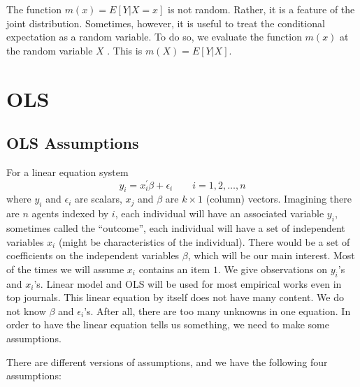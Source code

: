 \documentclass[11pt,a4paper]{amsart}
\theoremstyle{plain}
\theoremstyle{definition}
\begin{document}
	The function $m(x) = E [Y | X = x]$ is not random. Rather, it is a feature of the joint distribution. Sometimes, however, it is useful to treat the conditional expectation as a random variable. To do so, we evaluate the function $m(x)$ at the random variable $X$ . This is $m(X) = E[Y|X]$.

\section{OLS}
\subsection{OLS Assumptions}
	For a linear equation system 
	\[	y_{i} = x^{'}_{i} \beta + \epsilon_{i} \qquad i = 1,2, \dots, n	\]
	where $y_{i}$ and $\epsilon_{i}$ are scalars, $x_{j}$ and $\beta$ are $k \times 1$ (column) vectors. Imagining there are $n$ agents indexed by $i$, each individual will have an associated variable $y_{i}$, sometimes called the ``outcome'', each individual will have a set of independent variables $x_{i}$ (might be characteristics of the individual). There would be a set of coefficients on the independent variables $\beta$, which will be our main interest. Most of the times we will assume $x_{i}$ contains an item $1$. We give observations on $y_{i}$'s and $x_{i}$'s. Linear model and OLS will be used for most empirical works even in top journals. This linear equation by itself does not have many content. We do not know $\beta$ and $\epsilon_{i}$'s. After all, there are too many unknowns in one equation. In order to have the linear equation tells us something, we need to make some assumptions. \par 
	There are different versions of assumptions, and we have the following four assumptions:
\end{document}
